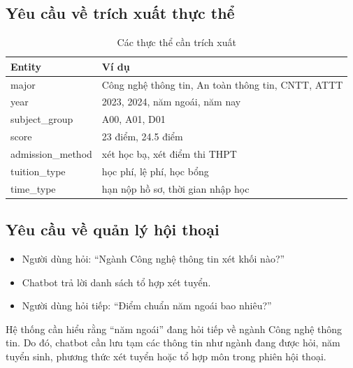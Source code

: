 \documentclass[12pt,a4paper]{report}
\begin{document}
\subsection{Yêu cầu về trích xuất thực thể}
\begin{table}[H]
\centering
\caption{Các thực thể cần trích xuất}
\label{tab:entities_main}
\begin{tabular}{|p{3.2cm}|p{8.8cm}|}
\hline
\textbf{Entity} & \textbf{Ví dụ} \\ \hline
major & Công nghệ thông tin, An toàn thông tin, CNTT, ATTT \\ \hline
year & 2023, 2024, năm ngoái, năm nay \\ \hline
subject\_group & A00, A01, D01 \\ \hline
score & 23 điểm, 24.5 điểm \\ \hline
admission\_method & xét học bạ, xét điểm thi THPT \\ \hline
tuition\_type & học phí, lệ phí, học bổng \\ \hline
time\_type & hạn nộp hồ sơ, thời gian nhập học \\ \hline
\end{tabular}
\end{table}

\subsection{Yêu cầu về quản lý hội thoại}
\begin{itemize}
    \item Người dùng hỏi: ``Ngành Công nghệ thông tin xét khối nào?''
    \item Chatbot trả lời danh sách tổ hợp xét tuyển.
    \item Người dùng hỏi tiếp: ``Điểm chuẩn năm ngoái bao nhiêu?''
\end{itemize}

Hệ thống cần hiểu rằng ``năm ngoái'' đang hỏi tiếp về ngành Công nghệ thông tin. Do đó, chatbot cần lưu tạm các thông tin như ngành đang được hỏi, năm tuyển sinh, phương thức xét tuyển hoặc tổ hợp môn trong phiên hội thoại.
\end{document}
